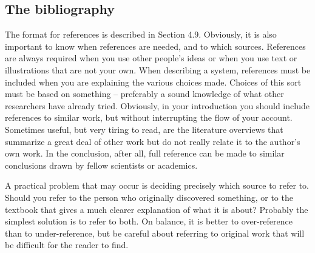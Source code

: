 \subsection{The bibliography}\label{sec:_the_bibliography}
The format for references is described in Section 4.9.
Obviously, it is also important to know when references are needed, and to which sources.
References are always required when you use other people’s ideas or when you use text or illustrations that are not your own.
When describing a system, references must be included when you are explaining the various choices made.
Choices of this sort must be based on something – preferably a sound knowledge of what other researchers have already tried.
Obviously, in your introduction you should include references to similar work, but without interrupting the flow of your account.
Sometimes useful, but very tiring to read, are the literature overviews that summarize a great deal of other work but do not really relate it to the author’s own work.
In the conclusion, after all, full reference can be made to similar conclusions drawn by fellow scientists or academics.

A practical problem that may occur is deciding precisely which source to refer to.
Should you refer to the person who originally discovered something, or to the textbook that gives a much clearer explanation of what it is about? Probably the simplest solution is to refer to both.
On balance, it is better to over-reference than to under-reference, but be careful about referring to original work that will be difficult for the reader to find.